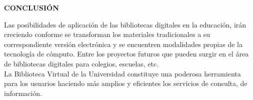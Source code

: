 \documentclass{article}
\begin{document}
\begin{multicols}{2}
\begin{center}
\textbf{CONCLUSIÓN} 
\end{center}
Las posibilidades de aplicación de las bibliotecas digitales en la educación, irán creciendo conforme se transforman los materiales tradicionales a su correspondiente versión electrónica y se encuentren modalidades propias de la tecnología de cómputo. Entre los proyectos futuros que pueden surgir en el área de bibliotecas digitales para colegios, escuelas, etc. \\
La Biblioteca Virtual de la Universidad constituye una poderosa herramienta para los usuarios haciendo más amplios y eficientes los servicios de consulta, de información.

\end{multicols}
\end{document}
